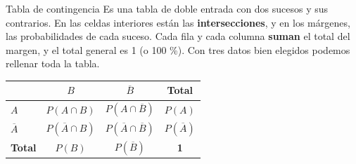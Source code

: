 \documentclass[11pt,a4paper]{article}
\begin{document}
\begin{fmdef}{Tabla de contingencia}
Es una tabla de doble entrada con dos sucesos y sus contrarios. En las celdas interiores están las \textbf{intersecciones}, y en los márgenes, las probabilidades de cada suceso. Cada fila y cada columna \textbf{suman} el total del margen, y el total general es 1 (o 100 \%). Con tres datos bien elegidos podemos rellenar toda la tabla.

\begin{center}\renewcommand{\arraystretch}{1.55}\setlength{\tabcolsep}{9pt}\begin{tabular}{l|cc|c}\toprule
\textbf{} & \textbf{$B$} & \textbf{$\overline{B}$} & \textbf{Total}\\\midrule
\textbf{$A$} & $P(A\cap B)$ & $P(A\cap\overline{B})$ & \textbf{$P(A)$}\\
\textbf{$\overline{A}$} & $P(\overline{A}\cap B)$ & $P(\overline{A}\cap\overline{B})$ & \textbf{$P(\overline{A})$}\\
\midrule\textbf{Total} & \textbf{$P(B)$} & \textbf{$P(\overline{B})$} & \textbf{1}\\
\bottomrule\end{tabular}\end{center}
\end{fmdef}
\end{document}
